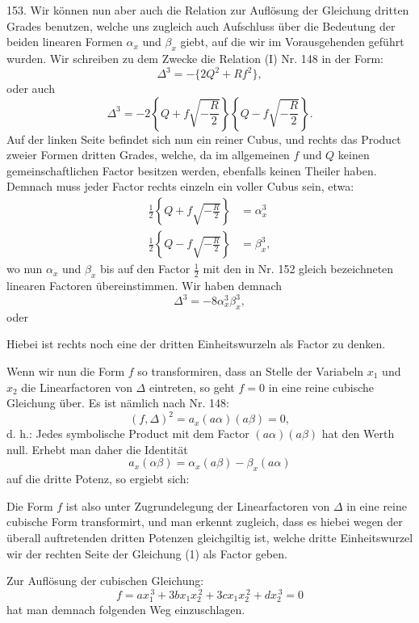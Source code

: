 153. Wir können nun aber auch die  Relation zur Auflösung der Gleichung dritten Grades benutzen, welche uns zugleich auch Aufschluss über die Bedeutung der beiden linearen Formen $\alpha_x$ und $\beta_x$ giebt, auf die wir im Vorausgehenden geführt wurden. Wir schreiben zu dem Zwecke die Relation (I) Nr. 148 in der Form:
\[
\Delta^3 = -\{2Q^2 + Rf^2\},
\]
oder auch
\[
\Delta^3 = -2\left\{Q+f\sqrt{-\frac{R}{2}}\right\}\left\{Q-f\sqrt{-\frac{R}{2}}\right\}.
\]
Auf der linken Seite befindet sich nun ein reiner Cubus, und rechts das Product zweier Formen dritten Grades, welche, da im allgemeinen $f$ und $Q$ keinen gemeinschaftlichen Factor besitzen werden, ebenfalls keinen Theiler haben. Demnach muss jeder Factor rechts einzeln ein voller Cubus sein, etwa:
\[
\begin{aligned}
\frac{1}{2}\left\{Q+f\sqrt{-\frac{R}{2}}\right\} &= \alpha_x^3\\
\frac{1}{2}\left\{Q-f\sqrt{-\frac{R}{2}}\right\} &= \beta_x^3,
\end{aligned}
\]
wo nun $\alpha_x$ und $\beta_x$ bis auf den Factor $\frac{1}{2}$ mit den in Nr. 152 gleich bezeichneten linearen Factoren übereinstimmen. Wir haben demnach
\[
\Delta^3 = -8\alpha_x^3\beta_x^3,
\]
oder



Hiebei ist rechts noch eine der dritten Einheitswurzeln als Factor zu denken.

Wenn wir nun die Form $f$ so transformiren, dass an Stelle der Variabeln $x_1$ und $x_2$ die Linearfactoren von $\Delta$ eintreten, so geht $f=0$ in eine reine cubische Gleichung über. Es ist nämlich nach Nr. 148:
\[
(f,\Delta)^2=a_x(a\alpha)(a\beta)=0,
\]
d. h.: \glqq Jedes symbolische Product mit dem Factor $(a\alpha)(a\beta)$ hat den Werth null.\grqq{} Erhebt man daher die Identität
\[
a_x(\alpha\beta)=\alpha_x(a\beta)-\beta_x(a\alpha)
\]
auf die dritte Potenz, so ergiebt sich:

Die Form $f$ ist also unter Zugrundelegung der Linearfactoren von $\Delta$ in eine reine cubische Form transformirt, und man erkennt zugleich, dass es hiebei wegen der überall auftretenden dritten Potenzen gleichgiltig ist, welche dritte Einheitswurzel wir der rechten Seite der Gleichung (1) als Factor geben.

Zur Auflösung der cubischen Gleichung:
\[
f=ax_1^{\,3}+3bx_1x_2^{\,2}+3cx_1x_2^{\,2}+dx_2^{\,3}=0
\] %
hat man demnach folgenden Weg einzuschlagen.

